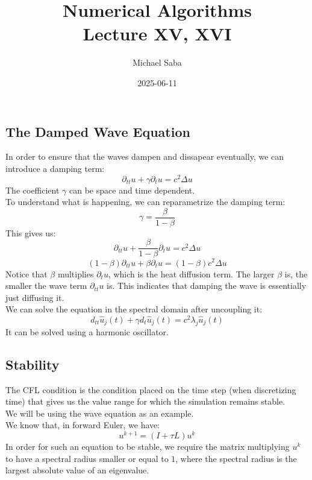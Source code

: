 \documentclass[12pt]{article}
\title{%
    \Huge Numerical Algorithms \\
    \Large Lecture XV, XVI
}
\date{2025-06-11}
\author{Michael Saba}
\begin{document}
\maketitle
\newpage
\setlength{\parindent}{0pt}


\subsection*{The Damped Wave Equation}

In order to ensure that the waves dampen and dissapear
eventually, we can introduce a damping term:
\[\partial_{tt} u + \gamma \partial_t u = c^2 \Delta u \]
The coefficient $\gamma$ can be space and time dependent. \\

To understand what is happening, we can reparametrize
the damping term:
\[ \gamma = \dfrac{\beta}{1 - \beta} \]
This gives us:
\[\partial_{tt} u + \dfrac{\beta}{1 - \beta} \partial_t u 
= c^2 \Delta u \]
\[(1 - \beta)\partial_{tt} u + \beta \partial_t u 
= (1 - \beta)c^2 \Delta u \]
Notice that $\beta$ multiplies $\partial_t u $,
which is the heat diffusion term. The larger $\beta$
is, the smaller the wave term $\partial_{tt} u$
is. This indicates that damping the wave is essentially
just diffusing it. \\

We can solve the equation
in the spectral domain after uncoupling it:
\[ d_{tt}\hat{u}_j(t) + \gamma d_t\hat{u}_j(t) = 
c^2 \lambda_j \hat{u}_j(t) \]
It can be solved using a harmonic oscillator.

\newpage

\subsection*{Stability}

The CFL condition is the condition placed on the
time step (when discretizing time) that gives us the
value range for which the simulation remains stable. \\

We will be using the wave equation as an example. \\

We know that, in forward Euler, we have:
\[ u^{k+1} = (I + \tau L)u^k \]
In order for such an equation to be stable, we require
the matrix multiplying $u^k$ to have a spectral
radius smaller or equal to $1$, where the spectral
radius is the largest absolute value of an eigenvalue. \\
\end{document}
